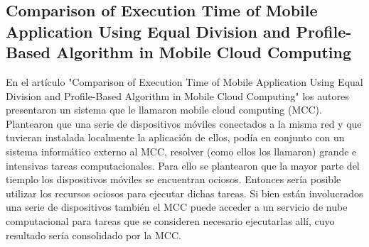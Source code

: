 \subsection{Comparison of Execution Time of Mobile
            Application Using Equal Division
            and Profile-Based Algorithm in Mobile
            Cloud Computing
}

En el artículo "Comparison of Execution Time of Mobile
Application Using Equal Division
and Profile-Based Algorithm in Mobile
Cloud Computing"\cite[pág. 59]{chaudharyMicroservices2020} los autores presentaron un sistema que le llamaron mobile cloud computing (MCC).
Plantearon que una serie de dispositivos móviles conectados a la misma red y que tuvieran instalada localmente la aplicación de ellos, podía en conjunto con un sistema informático externo al MCC, resolver (como ellos los llamaron) grande e intensivas tareas computacionales. Para ello se plantearon que la mayor parte del tiemplo los dispositivos móviles se encuentran ociosos. Entonces sería posible utilizar los recursos ociosos para ejecutar dichas tareas. Si bien están involucrados una serie de dispositivos también el MCC puede acceder a un servicio de nube computacional para tareas que se consideren necesario ejecutarlas allí, cuyo resultado sería consolidado por la MCC.\par

